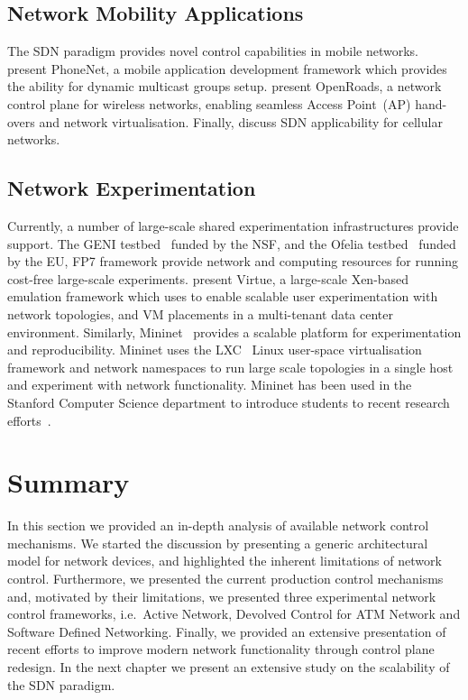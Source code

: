 \subsection{Network Mobility Applications}

The SDN paradigm provides novel control capabilities in mobile networks.
 present PhoneNet, a mobile application development framework
which provides the ability for dynamic multicast groups setup.
 present OpenRoads, a network control plane for wireless
networks, enabling seamless Access Point~(AP) hand-overs and network
virtualisation.  Finally,  discuss SDN applicability for
cellular networks.

\subsection{Network Experimentation}

Currently, a number of large-scale shared experimentation infrastructures provide
\of support. The GENI testbed~ funded by the NSF, and the Ofelia
testbed~ funded by the EU, FP7 framework provide network and
computing resources for running cost-free large-scale experiments.  
present Virtue, a large-scale Xen-based emulation framework which uses \of
to enable scalable user experimentation with network topologies, and VM
placements in a multi-tenant data center environment. Similarly,
Mininet~  provides a scalable platform  for \of
experimentation and reproducibility. Mininet uses the LXC~ Linux
user-space virtualisation framework and network namespaces to run large scale
topologies in a single host and experiment with network functionality.  Mininet
has been used in the Stanford Computer Science department to introduce students
to recent research efforts~. 

\section{Summary}

In this section we provided an in-depth analysis of available network control
mechanisms.  We started the discussion by presenting a generic architectural
model for network devices, and highlighted the inherent limitations of network
control. Furthermore, we presented the current production  control mechanisms
and, motivated by their limitations, we presented three experimental network
control frameworks, i.e.~Active Network, Devolved Control for ATM Network and
Software Defined Networking. Finally, we provided an extensive presentation of
recent efforts to improve modern network functionality through control plane
redesign. In the next chapter we present an extensive study on the scalability
of the SDN paradigm. 
